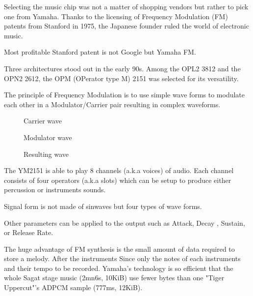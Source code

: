 Selecting the music chip was not a matter of shopping vendors but rather to pick one from Yamaha. Thanks to the licensing of Frequency Modulation (FM) patents from Stanford in 1975, the Japanese founder ruled the world of electronic music.

\begin{trivia}
Most profitable Stanford patent is not Google but Yamaha FM.

\end{trivia}
Three architectures stood out in the early 90s. Among the OPL2 3812 and the OPN2 2612, the OPM (OPerator type M) 2151 was selected for its versatility. 



The principle of Frequency Modulation is to use simple wave forms to modulate each other in a Modulator/Carrier pair resulting in complex waveforms\cite{fmProgramming}.

\begin{figure}[H]
\caption*{Carrier wave}
\end{figure}

\begin{figure}[H]
\caption*{Modulator wave}
\end{figure}

\begin{figure}[H]
\caption*{Resulting wave}
\end{figure}







The YM2151 is able to play 8 channels (a.k.a voices) of audio. Each channel consists of four operators (a.k.a slots) which can be setup to produce either percussion or instruments sounds. 

Signal form is not made of sinwaves but four types of wave forms.
 



Other parameters can be applied to the output such as Attack, Decay , Sustain, or Release Rate. 


The huge advantage of FM synthesis is the small amount of data required to store a melody. After the instruments Since only the notes of each instruments and their tempo to be recorded. Yamaha's technology is so efficient that the whole Sagat stage music (2mn6s, 10KiB) use fewer bytes than one "Tiger Uppercut"'s ADPCM sample (777ms, 12KiB).




